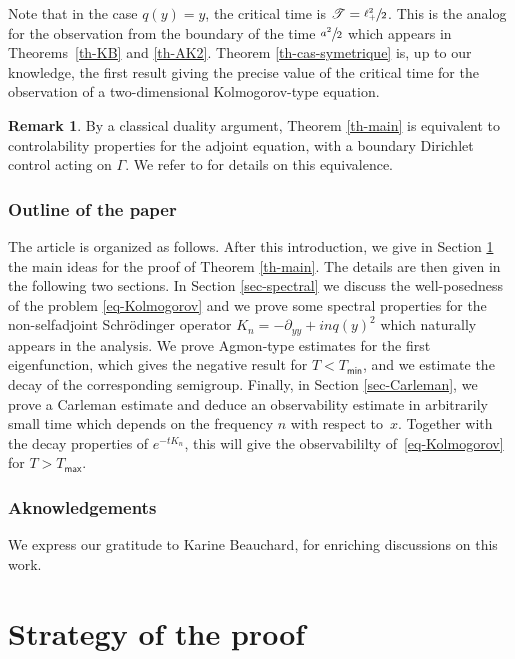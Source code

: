 \documentclass[11pt]{article}
\numberwithin{equation}{section}
\let\mathcal\mathscr
\theoremstyle{plain}
\theoremstyle{definition}
\newtheorem{remark}[theorem]{Remark}
\newcommand{\1}{\mathds 1}
\newcommand{\Tc}{{\mathcal T}}
\newcommand{\Tmin}{T_{\mathsf{min}}}
\newcommand{\Tmax}{T_{\mathsf{max}}}
\begin{document}
Note that in the case $q(y) = y$, the critical time is $\Tc = \sfrac{\ell_+^2}{2}$. This is the analog for the observation from the boundary of the time $\sfrac {a^2}2$ which appears in Theorems~\ref{th-KB} and \ref{th-AK2}. Theorem \ref{th-cas-symetrique} is,
up to our knowledge, the first result giving the precise value of the critical time for the observation
of a two-dimensional Kolmogorov-type equation.

\begin{remark}
By a classical duality argument, Theorem \ref{th-main} is equivalent to controlability properties for the adjoint equation, with a boundary Dirichlet control acting on $\Gamma$. We refer to \cite{tucsnak} for details on this equivalence.
\end{remark}

\subsubsection*{Outline of the paper} The article is organized as follows. After this introduction, we give in Section \ref{sec-strategy} the main ideas for the proof of Theorem \ref{th-main}. The details are then given in the following two sections. In Section \ref{sec-spectral} we discuss the well-posedness of the problem \eqref{eq-Kolmogorov} and we prove some spectral properties for the non-selfadjoint Schrödinger operator $K_n = -\partial_{yy} + inq(y)^2$ which naturally appears in the analysis. We prove Agmon-type estimates for the first eigenfunction, which gives the negative result for $T < \Tmin$, and we estimate the decay of the corresponding semigroup. Finally, in Section \ref{sec-Carleman}, we prove a Carleman estimate and deduce an observability estimate in arbitrarily small time which depends on the frequency $n$ with respect to~$x$. Together with the decay properties of $e^{-tK_n}$, this will give the observabililty of~\eqref{eq-Kolmogorov} for $T > \Tmax$.

\subsubsection*{Aknowledgements} We express our gratitude to Karine Beauchard, for enriching discussions on this work.


\section{Strategy of the proof} \label{sec-strategy}
\end{document}
